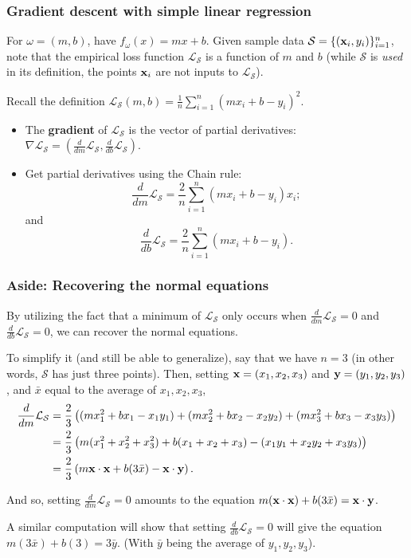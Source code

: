 \documentclass{beamer}
\theoremstyle{example}
\begin{document}
\begin{frame}
\frametitle{Gradient descent with simple linear regression}
For $\omega = (m, b)$, have $f_{\omega}(x) = mx + b$. Given sample data $\mathcal S=\{({\bf x}_i, y_i)\}_{i=1}^n$, note that the empirical loss function $\mathcal L_{\mathcal S}$ is a function of $m$ and $b$ (while $\mathcal S$ is \textit{used} in its definition, the points ${\bf x}_i$ are not inputs to $\mathcal L_{\mathcal S}$).
\pause 

Recall the definition $\mathcal L_{\mathcal S}(m,b) = \frac1{n}\sum_{i=1}^n (mx_i + b - y_i)^2$.
\begin{itemize}
    \item The \textbf{gradient} of $\mathcal L_{\mathcal S}$ is the vector of partial derivatives: $\nabla\mathcal L_{\mathcal S} = \left( \frac{d}{dm}\mathcal L_{\mathcal S}, \frac{d}{db}\mathcal L_{\mathcal S} \right)$.
    \pause
    \item Get partial derivatives using the Chain rule: 
            \[\frac{d}{dm}\mathcal L_{\mathcal S} = \frac{2}{n}\sum_{i=1}^n(mx_i + b - y_i)x_i;\]
        and 
            \[\frac{d}{db}\mathcal L_{\mathcal S} = \frac{2}{n}\sum_{i=1}^n(mx_i + b - y_i).\]
\end{itemize}

\end{frame}

\begin{frame}
    \frametitle{Aside: Recovering the normal equations}
    By utilizing the fact that a minimum of $\mathcal L_{\mathcal S}$ only occurs when $\frac{d}{dm}\mathcal L_{\mathcal S} = 0$ and $\frac{d}{db}\mathcal L_{\mathcal S} = 0$,
    we can recover the normal equations.
    
    \pause
    To simplify it (and still be able to generalize), say that we have $n=3$ (in other words, $\mathcal S$ has just three points). Then, setting ${\bf x} = (x_1,x_2,x_3)$ and ${\bf y} = (y_1,y_2,y_3)$, and $\bar{x}$ equal to the average of $x_1,x_2,x_3$,
    \pause
    {\small
        \begin{align*}
            \frac{d}{dm}\mathcal L_{\mathcal S}     &= \frac{2}{3}\left((mx_1^2 + bx_1 - x_1y_1) + (mx_2^2 + bx_2 - x_2y_2) + (mx_3^2 + bx_3 - x_3y_3) \right) \\ 
                                                    &= \frac{2}{3}\left(m(x_1^2+x_2^2+x_3^2) + b(x_1+x_2+x_3) - (x_1y_1+x_2y_2+x_3y_3) \right) \\ 
                                                    &= \frac{2}{3}\left(m{\bf x}\cdot{\bf x} + b(3\bar{x}) - {\bf x}\cdot{\bf y}\right).
        \end{align*}
    }
    
    \pause
    And so, setting $\frac{d}{dm}\mathcal L_{\mathcal S} = 0$ amounts to the equation $m({\bf x}\cdot{\bf x}) + b(3\bar{x}) = {\bf x}\cdot{\bf y}$. 

    \pause
    A similar computation will show that setting $\frac{d}{db}\mathcal L_{\mathcal S} = 0$ will give the equation $m(3\bar{x}) + b(3) = 3\bar{y}$. (With $\bar{y}$ being the average of $y_1,y_2,y_3$). 
\end{frame}
\end{document}
